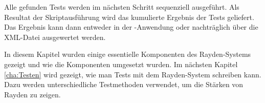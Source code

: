 \SuperPar
Alle gefunden Tests werden im nächsten Schritt sequenziell ausgeführt. Als Resultat der Skriptausführung wird das kumulierte Ergebnis der Tests geliefert. Das Ergebnis kann dann entweder in der -Anwendung oder nachträglich über die XML-Datei ausgewertet werden.

\SuperPar
In diesem Kapitel wurden einige essentielle Komponenten des Rayden-Systems gezeigt und wie die Komponenten umgesetzt wurden. Im nächsten Kapitel \ref{cha:Testen} wird gezeigt, wie man Tests mit dem Rayden-System schreiben kann. Dazu werden unterschiedliche Testmethoden verwendet, um die Stärken von Rayden zu zeigen.
